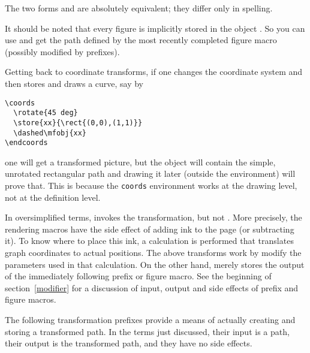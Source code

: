 \documentclass[letterpaper]{article}
\begin{document}
The two forms  and  are absolutely equivalent; they
differ only in spelling.

It should be noted that every \mfp{} figure is implicitly stored in the
object . So you can use  and get
the path defined by the most recently completed figure macro (possibly
modified by prefixes).

Getting back to coordinate transforms, if one changes the coordinate
system and then stores and draws a curve, say by
\begin{verbatim}
\coords
  \rotate{45 deg}
  \store{xx}{\rect{(0,0),(1,1)}}
  \dashed\mfobj{xx}
\endcoords
\end{verbatim}
one will get a transformed picture, but the object 
will contain the simple, unrotated rectangular path and drawing it later
(outside the  environment) will prove that. This is because
the \texttt{coords} environment works at the drawing level, not at the
definition level.

In oversimplified terms,  invokes the transformation, but not
. More precisely, the rendering macros have the side effect of
adding ink to the page (or subtracting it). To know where to place this
ink, a calculation is performed that translates graph coordinates to
actual positions. The above transforms work by modify the parameters
used in that calculation.  On the other hand,  merely stores
the output of the immediately following prefix or figure macro. See the
beginning of section~\ref{modifier} for a discussion of input, output
and side effects of \mfp{} prefix and figure macros.

The following transformation prefixes provide a means of actually
creating and storing a transformed path. In the terms just discussed,
their input is a path, their output is the transformed path, and they
have no side effects.
\end{document}
